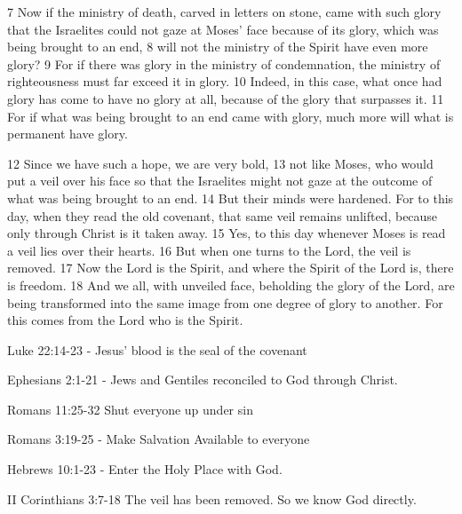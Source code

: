 \begin{bible}

7 Now if the ministry of death, carved in letters on stone, came with such glory that the Israelites could not gaze at Moses' face because of its glory, which was being brought to an end, 8 will not the ministry of the Spirit have even more glory? 9 For if there was glory in the ministry of condemnation, the ministry of righteousness must far exceed it in glory. 10 Indeed, in this case, what once had glory has come to have no glory at all, because of the glory that surpasses it. 11 For if what was being brought to an end came with glory, much more will what is permanent have glory.

12 Since we have such a hope, we are very bold, 13 not like Moses, who would put a veil over his face so that the Israelites might not gaze at the outcome of what was being brought to an end. 14 But their minds were hardened. For to this day, when they read the old covenant, that same veil remains unlifted, because only through Christ is it taken away. 15 Yes, to this day whenever Moses is read a veil lies over their hearts. 16 But when one turns to the Lord, the veil is removed. 17 Now the Lord is the Spirit, and where the Spirit of the Lord is, there is freedom. 18 And we all, with unveiled face, beholding the glory of the Lord, are being transformed into the same image from one degree of glory to another. For this comes from the Lord who is the Spirit.

\end{bible}


\begin{discussion}



Luke 22:14-23 - Jesus' blood is the seal of the covenant

Ephesians 2:1-21 - Jews and Gentiles reconciled to God through Christ.


Romans 11:25-32 Shut everyone up under sin

Romans 3:19-25 - Make Salvation Available to everyone

Hebrews 10:1-23 - Enter the Holy Place with God.


II Corinthians 3:7-18 The veil has been removed.  So we know God directly.

\end{discussion}